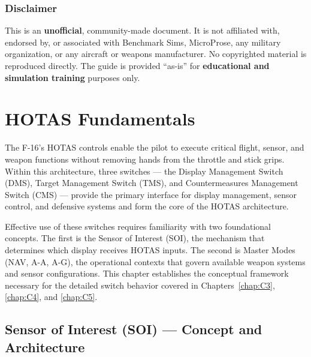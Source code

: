 \documentclass[11pt, a4paper, twoside]{report}
\begin{document}
\subsection{Disclaimer}
\label{sec:C1-S4-S5}

This is an \textbf{unofficial}, community-made document. It is not affiliated with, endorsed by, or associated with Benchmark Sims, MicroProse, any military organization, or any aircraft or weapons manufacturer. No copyrighted material is reproduced directly. The guide is provided ``as-is'' for \textbf{educational and simulation training} purposes only.

\newpage
\chapter{HOTAS Fundamentals}
\label{chap:C2}

The F-16's HOTAS controls enable the pilot to execute critical flight, sensor, and weapon functions without removing hands from the throttle and stick grips. Within this architecture, three switches — the Display Management Switch (DMS), Target Management Switch (TMS), and Countermeasures Management Switch (CMS) — provide the primary interface for display management, sensor control, and defensive systems and form the core of the HOTAS architecture.

Effective use of these switches requires familiarity with two foundational concepts. The first is the Sensor of Interest (SOI), the mechanism that determines which display receives HOTAS inputs. The second is Master Modes (NAV, A-A, A-G), the operational contexts that govern available weapon systems and sensor configurations. This chapter establishes the conceptual framework necessary for the detailed switch 
behavior covered in Chapters~\ref{chap:C3}, \ref{chap:C4}, and \ref{chap:C5}.

\section{Sensor of Interest (SOI) — Concept and Architecture}
\label{sec:C2-S1}
\end{document}
